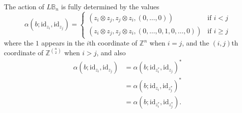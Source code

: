 \documentclass{amsbook} %
\newcommand{\id}{\textrm{id}}
\numberwithin{section}{chapter}
\begin{document}
\begin{prop} \label{invbraidact} The action of $L\mathbb{B}_n$ is fully determined by the values
  \[
    \alpha(b;\id_{z_i}, \id_{z_j}) = 
    \begin{cases}
			\left(z_i \otimes z_j, z_j \otimes z_i,(0, \ldots, 0) \right) & \text{if } i < j \\
			\left(z_i \otimes z_j, z_j \otimes z_i, (0,\ldots,0, 1, 0,\ldots,0) \right) & \text{if } i \ge j
		\end{cases} 
  \]
where the $1$ appears in the $i$th coordinate of $\mathbb{Z}^{n}$ when $i=j$, and the $(i,j)$th coordinate of $\mathbb{Z}^{\binom{n}{2}}$ when $i>j$, and also
  \begin{align*} 
		\alpha(  b  ;  \id_{z_i}, \id_{z_j}) &= \alpha(  b  ;  \id_{z_i^*}, \id_{z_j}  )^* \\
		&= \alpha(  b  ;  \id_{z_i}, \id_{z_j^*})^* \\
		&= \alpha(  b  ;  \id_{z_i^*}, \id_{z_j^*}).
	\end{align*}
\end{prop}
\end{document}
